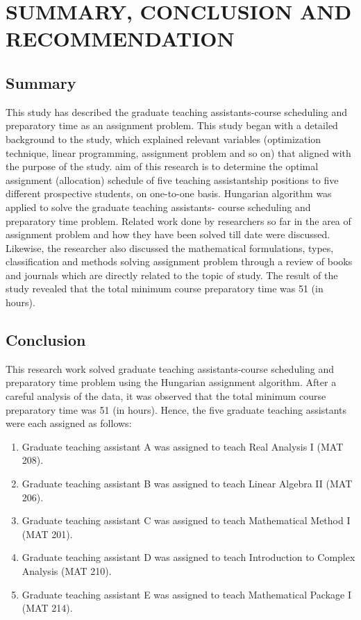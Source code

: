 \documentclass[11pt]{report}
\begin{document}
	\chapter{SUMMARY, CONCLUSION AND RECOMMENDATION}
	\section{Summary}
	This study has described the graduate teaching assistants-course scheduling and preparatory time
	as an assignment problem. This study began with a detailed background to the study, which explained relevant variables (optimization technique, linear programming, assignment problem and so on) that aligned with the purpose of the study. aim of this research is to determine the optimal assignment (allocation) schedule of five teaching assistantship positions to five different
	prospective students, on one-to-one basis. Hungarian algorithm was applied to solve the graduate teaching assistants- course scheduling and preparatory time problem. Related work done by researchers so far in the area of assignment problem and how they have been solved till date were discussed. Likewise, the researcher also discussed the mathematical formulations, types,
	classification and methods solving assignment problem through a review of books and journals	which are directly related to the topic of study. The result of the study revealed that the total minimum course preparatory time was 51 (in hours).
	
	
	\section{Conclusion}
	This research work solved graduate teaching assistants-course scheduling and preparatory time problem using the Hungarian assignment algorithm. After a careful analysis of the data, it was observed that the total minimum course preparatory time was 51 (in hours). Hence, the five graduate teaching assistants were each assigned as follows:
	\begin{enumerate}
		\item Graduate teaching assistant A was assigned to teach Real Analysis I (MAT 208).
		\item Graduate teaching assistant B was assigned to teach Linear Algebra II (MAT 206).
		\item Graduate teaching assistant C was assigned to teach Mathematical Method I (MAT 201).
		\item Graduate teaching assistant D was assigned to teach Introduction to Complex Analysis
		(MAT 210).
		\item Graduate teaching assistant E was assigned to teach Mathematical Package I (MAT 214).
	\end{enumerate}
	
\end{document}
